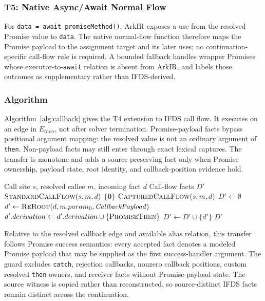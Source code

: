 \subsubsection{T5: Native Async/Await Normal Flow}

For \texttt{data = await promiseMethod()}, ArkIR exposes a use from the resolved Promise value to \texttt{data}. The native normal-flow function therefore maps the Promise payload to the assignment target and its later uses; no continuation-specific call-flow rule is required. A bounded fallback handles wrapper Promises whose executor-to-\texttt{await} relation is absent from ArkIR, and labels those outcomes as supplementary rather than IFDS-derived.

\subsubsection{Algorithm}

Algorithm~\ref{alg:callback} gives the T4 extension to IFDS call flow. It executes on an edge in $E_{then}$, not after solver termination. Promise-payload facts bypass positional argument mapping: the resolved value is not an ordinary argument of \texttt{then}. Non-payload facts may still enter through exact lexical captures. The transfer is monotone and adds a source-preserving fact only when Promise ownership, payload state, root identity, and callback-position evidence hold.

\begin{algorithm}[H]
\caption{Promise success-continuation IFDS call flow}
\label{alg:callback}
\footnotesize
\begin{algorithmic}[1]
\Require Call site $s$, resolved callee $m$, incoming fact $d$
\Ensure Call-flow facts $D'$
  \State \Return $\Call{StandardCallFlow}{s,m,d}$
\EndIf
{}
  \State \Return $\{\mathbf{0}\}$
\EndIf
{}
  \State \Return $\Call{CapturedCallFlow}{s,m,d}$
\EndIf
\State $D' \gets \emptyset$
  \State $d' \gets \Call{ReRoot}{d,m.param_0,\mathit{CallbackPayload}}$
  \State $d'.derivation \gets d'.derivation\cup\{\textsc{PromiseThen}\}$
  \State $D' \gets D'\cup\{d'\}$
\EndIf
\State \Return $D'$
\end{algorithmic}
\end{algorithm}

Relative to the resolved callback edge and available alias relation, this transfer follows Promise success semantics: every accepted fact denotes a modeled Promise payload that may be supplied as the first success-handler argument. The guard excludes \texttt{catch}, rejection callbacks, nonzero callback positions, custom resolved \texttt{then} owners, and receiver facts without Promise-payload state. The source witness is copied rather than reconstructed, so source-distinct IFDS facts remain distinct across the continuation.

